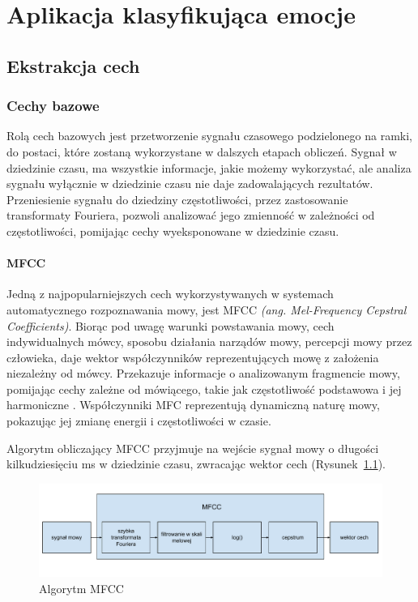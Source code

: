 \documentclass[a4paper,12pt,twoside,openany]{report}
\newcommand{\ang}[1]{\textit{(ang. #1)}}
\newcommand{\Rys}[1]{(Rysunek~\ref{#1})}
\begin{document}
\chapter{Aplikacja klasyfikująca emocje}
\section{Ekstrakcja cech}
\subsection{Cechy bazowe}
Rolą cech bazowych jest przetworzenie sygnału czasowego podzielonego na ramki,
do postaci, które zostaną wykorzystane w dalszych etapach obliczeń.
Sygnał w dziedzinie czasu, ma wszystkie informacje, jakie możemy wykorzystać, 
ale analiza sygnału wyłącznie w dziedzinie czasu nie daje zadowalających rezultatów.
Przeniesienie sygnału do dziedziny częstotliwości, przez zastosowanie transformaty Fouriera,
pozwoli analizować jego zmienność w zależności od częstotliwości, 
pomijając cechy wyeksponowane w dziedzinie czasu.
\subsubsection{MFCC}
Jedną z najpopularniejszych cech wykorzystywanych w systemach automatycznego rozpoznawania mowy,
jest MFCC \ang{Mel-Frequency Cepstral Coefficients}.
Biorąc pod uwagę warunki powstawania mowy, cech indywidualnych mówcy, sposobu działania narządów mowy, percepcji mowy przez człowieka,
daje wektor współczynników reprezentujących mowę z założenia niezależny od mówcy. 
Przekazuje informacje o analizowanym fragmencie mowy, pomijając cechy zależne od mówiącego, takie jak częstotliwość podstawowa i jej harmoniczne \cite{Hossan2013}.
Współczynniki MFC reprezentują dynamiczną naturę mowy, pokazując jej zmianę energii i częstotliwości w czasie.

Algorytm obliczający MFCC przyjmuje na wejście sygnał mowy o długości kilkudziesięciu ms w dziedzinie czasu,
zwracając wektor cech \Rys{rys:mgcc:schemat}.
\begin{figure}[h]
	\centering
	\includegraphics[width=\textwidth]{mfcc-schemat}
	\caption{Algorytm MFCC}
	\label{rys:mgcc:schemat}
\end{figure}
\end{document}

